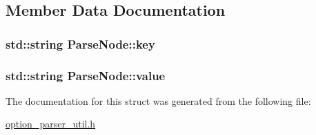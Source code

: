 \subsection{Member Data Documentation}
\hypertarget{structParseNode_a5aae5029919c06eeb77291728e4adfe0}{
\subsubsection[{key}]{\setlength{\rightskip}{0pt plus 5cm}std\-::string Parse\-Node\-::key}}\label{structParseNode_a5aae5029919c06eeb77291728e4adfe0}
\hypertarget{structParseNode_af848fb0386f5fa61625511f15382090a}{
\subsubsection[{value}]{\setlength{\rightskip}{0pt plus 5cm}std\-::string Parse\-Node\-::value}}\label{structParseNode_af848fb0386f5fa61625511f15382090a}


The documentation for this struct was generated from the following file\-:\begin{DoxyCompactItemize}
\item 
\hyperlink{option__parser__util_8h}{option\-\_\-parser\-\_\-util.\-h}\end{DoxyCompactItemize}
